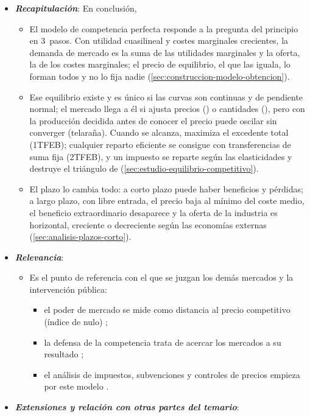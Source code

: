 \documentclass[11pt]{article}
\begin{document}
\begin{itemize}
\item \textbf{\emph{Recapitulación}}: En conclusión,
  \begin{itemize}
  \item El modelo de competencia perfecta responde a la pregunta del principio en 3~pasos. Con utilidad cuasilineal y costes marginales crecientes, la demanda de mercado es la suma de las utilidades marginales y la oferta, la de los costes marginales; el precio de equilibrio, el que las iguala, lo forman todos y no lo fija nadie (\ref{sec:construccion-modelo-obtencion}).
  \item Ese equilibrio existe y es único si las curvas son continuas y de pendiente normal; el mercado llega a él si ajusta precios () o cantidades (), pero con la producción decidida antes de conocer el precio puede oscilar sin converger (telaraña). Cuando se alcanza, maximiza el excedente total (1TFEB); cualquier reparto eficiente se consigue con transferencias de suma fija (2TFEB), y un impuesto se reparte según las elasticidades y destruye el triángulo de  (\ref{sec:estudio-equilibrio-competitivo}).
  \item El plazo lo cambia todo: a corto plazo puede haber beneficios y pérdidas; a largo plazo, con libre entrada, el precio baja al mínimo del coste medio, el beneficio extraordinario desaparece y la oferta de la industria es horizontal, creciente o decreciente según las economías externas (\ref{sec:analisis-plazos-corto}).
  \end{itemize}
\item \textbf{\emph{Relevancia}}:
  \begin{itemize}
  \item Es el punto de referencia con el que se juzgan los demás mercados y la intervención pública:
  \begin{itemize}
  \item el poder de mercado se mide como distancia al precio competitivo (índice de  nulo) ;
  \item la defensa de la competencia trata de acercar los mercados a su resultado ;
  \item el análisis de impuestos, subvenciones y controles de precios empieza por este modelo  .
  \end{itemize}
  \end{itemize}
\item \textbf{\emph{Extensiones y relación con otras partes del temario}}:

\end{itemize}
\end{document}
